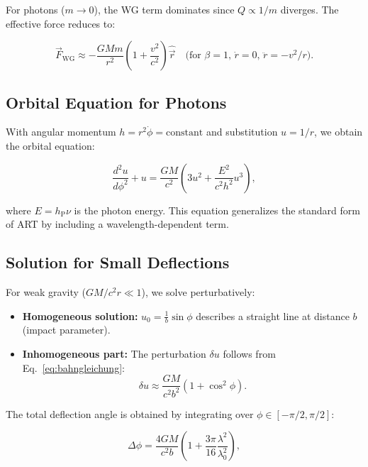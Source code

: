 For photons ($m \to 0$), the WG term dominates since $Q \propto 1/m$ diverges. The effective force reduces to:

\begin{equation}
\vec{F}_{\text{WG}} \approx -\frac{GMm}{r^2} \left(1 + \frac{v^2}{c^2}\right) \hat{\vec{r}} \quad \text{(for $\beta = 1$, $\dot{r} = 0$, $\ddot{r} = -v^2/r$)}.
\end{equation}

\subsection{Orbital Equation for Photons}
With angular momentum $h = r^2 \dot{\phi} = \text{constant}$ and substitution $u = 1/r$, we obtain the orbital equation:

\begin{equation}
\frac{d^2 u}{d\phi^2} + u = \frac{GM}{c^2} \left(3u^2 + \frac{E^2}{c^2 h^2} u^3\right),
\label{eq:bahngleichung}
\end{equation}

where $E = h_{\text{P}} \nu$ is the photon energy. This equation generalizes the standard form of ART by including a wavelength-dependent term.

\subsection{Solution for Small Deflections}
For weak gravity ($GM/c^2 r \ll 1$), we solve perturbatively:

\begin{itemize}
\item \textbf{Homogeneous solution:} $u_0 = \frac{1}{b} \sin \phi$ describes a straight line at distance $b$ (impact parameter).
\item \textbf{Inhomogeneous part:} The perturbation $\delta u$ follows from Eq.~\ref{eq:bahngleichung}:
\begin{equation}
\delta u \approx \frac{GM}{c^2 b^2} (1 + \cos^2 \phi).
\end{equation}
\end{itemize}

The total deflection angle is obtained by integrating over $\phi \in [-\pi/2, \pi/2]$:

\begin{equation}
    \label{eq:ablenkwinkel}
    \boxed
    {
        \Delta \phi = \frac{4GM}{c^2 b} \left(1 + \frac{3\pi}{16} \frac{\lambda^2}{\lambda_0^2}\right),
    }
\end{equation}

